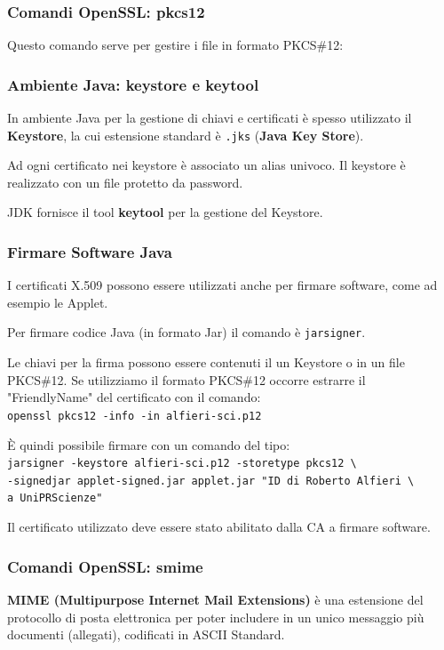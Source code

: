         \subsubsection{Comandi OpenSSL: pkcs12}
            Questo comando serve per gestire i file in formato PKCS\#12:

            

        \subsubsection{Ambiente Java: keystore e keytool}
            In ambiente Java per la gestione di chiavi e certificati è spesso utilizzato il \textbf{Keystore}, la cui estensione standard è \verb|.jks| (\textbf{Java Key Store}).
        
            Ad ogni certificato nei keystore è associato un alias univoco. Il keystore è realizzato con un file protetto da password.
        
            JDK fornisce il tool \textbf{keytool} per la gestione del Keystore.
        
        \subsubsection{Firmare Software Java}
            I certificati X.509 possono essere utilizzati anche per firmare software, come ad esempio le Applet.
        
            Per firmare codice Java (in formato Jar) il comando è \verb|jarsigner|.
        
            Le chiavi per la firma possono essere contenuti il un Keystore o in un file PKCS\#12. Se utilizziamo il formato PKCS\#12 occorre estrarre il "FriendlyName" del certificato con il comando:\\
            \verb|openssl pkcs12 -info -in alfieri-sci.p12|

            È quindi possibile firmare con un comando del tipo:\\
            \verb|jarsigner -keystore alfieri-sci.p12 -storetype pkcs12 \|\\
            \verb|-signedjar applet-signed.jar applet.jar "ID di Roberto Alfieri \|\\
            \verb|a UniPRScienze"|

            Il certificato utilizzato deve essere stato abilitato dalla CA a firmare software.

        \subsubsection{Comandi OpenSSL: smime}
            \textbf{MIME (Multipurpose Internet Mail Extensions)} è una estensione del protocollo di posta elettronica per poter includere in un unico messaggio più documenti (allegati), codificati in ASCII Standard.

